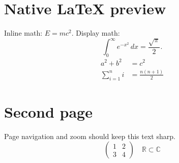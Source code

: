 \documentclass{article}
\begin{document}
\section{Native LaTeX preview}
\previewlocalmessage
Inline math: $E=mc^2$. Display math:
\[
\int_0^\infty e^{-x^2}\,dx = \frac{\sqrt{\pi}}{2}.
\]
\begin{align}
 a^2+b^2 &= c^2 \\
 \sum_{i=1}^n i &= \frac{n(n+1)}{2}
\end{align}
\newpage
\section{Second page}
Page navigation and zoom should keep this text sharp.
\[
\begin{pmatrix}1 & 2 \\ 3 & 4\end{pmatrix}
\quad \mathbb{R} \subset \mathbb{C}
\]
\end{document}
